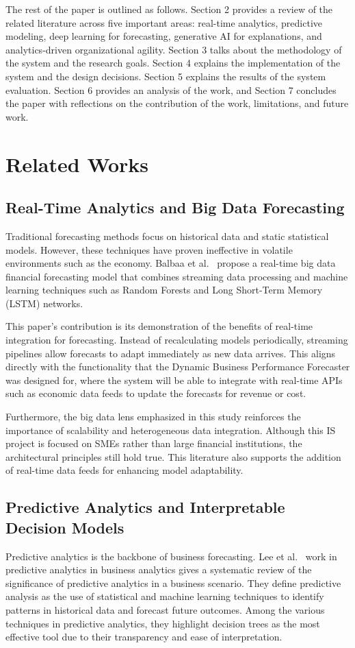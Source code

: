 \documentclass[12pt]{article}
\begin{document}
The rest of the paper is outlined as follows. Section 2 provides a review of the related literature across five important areas: real-time analytics, predictive modeling, deep learning for forecasting, generative AI for explanations, and analytics-driven organizational agility. Section 3 talks about the methodology of the system and the research goals. Section 4 explains the implementation  of the system and the design decisions. Section 5 explains the results of the system evaluation. Section 6 provides an analysis of the work, and Section 7 concludes the paper with reflections on the contribution of the work, limitations, and future work.
\section{Related Works}
\subsection{Real-Time Analytics and Big Data Forecasting}
Traditional forecasting methods focus on historical data and static statistical models. However, these techniques have proven ineffective in volatile environments such as the economy. Balbaa et al.~\cite{inproceedings} propose a real-time big data financial forecasting model that combines streaming data processing and machine learning techniques such as Random Forests and Long Short-Term Memory (LSTM) networks.

This paper’s contribution is its demonstration of the benefits of real-time integration for forecasting. Instead of recalculating models periodically, streaming pipelines allow forecasts to adapt immediately as new data arrives. This aligns directly with the functionality that the Dynamic Business Performance Forecaster was designed for, where the system will be able to integrate with real-time APIs such as economic data feeds to update the forecasts for revenue or cost.

Furthermore, the big data lens emphasized in this study reinforces the importance of scalability and heterogeneous data integration. Although this IS project is focused on SMEs rather than large financial institutions, the architectural principles still hold true. This literature also supports the addition of real-time data feeds for enhancing model adaptability.

\subsection{Predictive Analytics and Interpretable Decision Models}
Predictive analytics is the backbone of business forecasting.  Lee et al.~\cite{PredictiveAnalytics} work in predictive analytics in business analytics gives a systematic review of the significance of predictive analytics in a business scenario. They define predictive analysis as the use of statistical and machine learning techniques to identify patterns in historical data and forecast future outcomes. Among the various techniques in predictive analytics, they highlight decision trees as the most effective tool due to their transparency and ease of interpretation.
\end{document}
